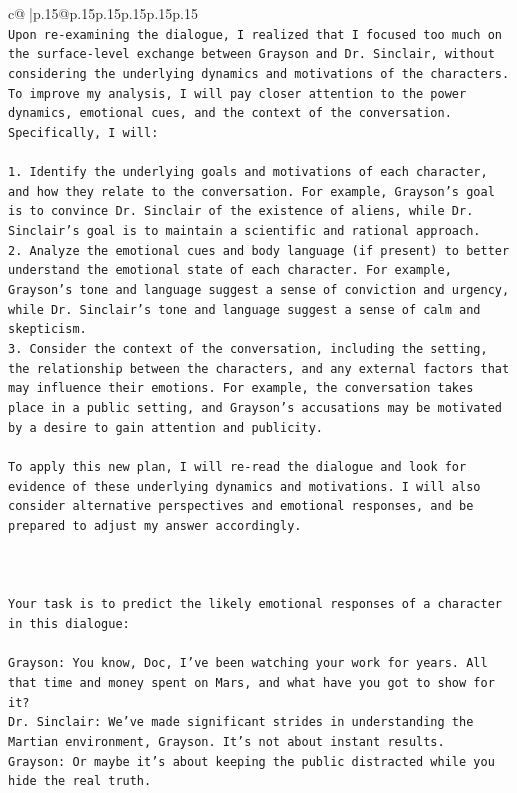 \documentclass{article}
\begin{document}
{\begin{supertabular}{c@{$\;$}|p{.15\linewidth}@{}p{.15\linewidth}p{.15\linewidth}p{.15\linewidth}p{.15\linewidth}p{.15\linewidth}}
{{{\\ 
\texttt{Upon re{-}examining the dialogue, I realized that I focused too much on the surface{-}level exchange between Grayson and Dr. Sinclair, without considering the underlying dynamics and motivations of the characters. To improve my analysis, I will pay closer attention to the power dynamics, emotional cues, and the context of the conversation. Specifically, I will:} \\
\\ 
\texttt{1. Identify the underlying goals and motivations of each character, and how they relate to the conversation. For example, Grayson's goal is to convince Dr. Sinclair of the existence of aliens, while Dr. Sinclair's goal is to maintain a scientific and rational approach.} \\
\texttt{2. Analyze the emotional cues and body language (if present) to better understand the emotional state of each character. For example, Grayson's tone and language suggest a sense of conviction and urgency, while Dr. Sinclair's tone and language suggest a sense of calm and skepticism.} \\
\texttt{3. Consider the context of the conversation, including the setting, the relationship between the characters, and any external factors that may influence their emotions. For example, the conversation takes place in a public setting, and Grayson's accusations may be motivated by a desire to gain attention and publicity.} \\
\\ 
\texttt{To apply this new plan, I will re{-}read the dialogue and look for evidence of these underlying dynamics and motivations. I will also consider alternative perspectives and emotional responses, and be prepared to adjust my answer accordingly.} \\
\\ 
\\ 
\\ 
\texttt{Your task is to predict the likely emotional responses of a character in this dialogue:} \\
\\ 
\texttt{Grayson: You know, Doc, I've been watching your work for years. All that time and money spent on Mars, and what have you got to show for it? } \\
\texttt{Dr. Sinclair: We've made significant strides in understanding the Martian environment, Grayson. It's not about instant results. } \\
\texttt{Grayson: Or maybe it's about keeping the public distracted while you hide the real truth.} \\
}}}
\end{supertabular}}
\end{document}
